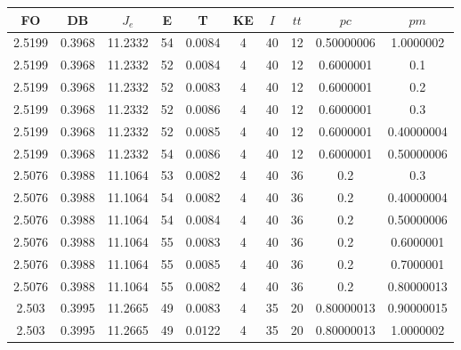 \begin{table}[h!]
    \footnotesize
    \begin{center}
        \begin{tabular}{|c|c|c|c|c|c|c|c|c|c|}
        \hline
            {\bf FO} & {\bf DB} & $J_e$ & {\bf E} & {\bf T} & {\bf KE} & $I$ & $tt$ & $pc$ & $pm$ \\
        \hline
        \hline
            2.5199 & 0.3968  & 11.2332 & 54 & 0.0084 & 4 & 40 & 12 & 0.50000006 & 1.0000002\\
        \hline
        \hline
            2.5199 & 0.3968  & 11.2332 & 52 & 0.0084 & 4 & 40 & 12 & 0.6000001 & 0.1\\
        \hline
        \hline
            2.5199 & 0.3968  & 11.2332 & 52 & 0.0083 & 4 & 40 & 12 & 0.6000001 & 0.2\\
        \hline
        \hline
            2.5199 & 0.3968  & 11.2332 & 52 & 0.0086 & 4 & 40 & 12 & 0.6000001 & 0.3\\
        \hline
        \hline
            2.5199 & 0.3968  & 11.2332 & 52 & 0.0085 & 4 & 40 & 12 & 0.6000001 & 0.40000004\\
        \hline
        \hline
            2.5199 & 0.3968  & 11.2332 & 54 & 0.0086 & 4 & 40 & 12 & 0.6000001 & 0.50000006\\
        \hline
        \hline
            2.5076 & 0.3988  & 11.1064 & 53 & 0.0082 & 4 & 40 & 36 & 0.2 & 0.3\\
        \hline
        \hline
            2.5076 & 0.3988  & 11.1064 & 54 & 0.0082 & 4 & 40 & 36 & 0.2 & 0.40000004\\
        \hline
        \hline
            2.5076 & 0.3988  & 11.1064 & 54 & 0.0084 & 4 & 40 & 36 & 0.2 & 0.50000006\\
        \hline
        \hline
            2.5076 & 0.3988  & 11.1064 & 55 & 0.0083 & 4 & 40 & 36 & 0.2 & 0.6000001\\
        \hline
        \hline
            2.5076 & 0.3988  & 11.1064 & 55 & 0.0085 & 4 & 40 & 36 & 0.2 & 0.7000001\\
        \hline
        \hline
            2.5076 & 0.3988  & 11.1064 & 55 & 0.0082 & 4 & 40 & 36 & 0.2 & 0.80000013\\
        \hline
        \hline
            2.503 & 0.3995  & 11.2665 & 49 & 0.0083 & 4 & 35 & 20 & 0.80000013 & 0.90000015\\
        \hline
        \hline
            2.503 & 0.3995  & 11.2665 & 49 & 0.0122 & 4 & 35 & 20 & 0.80000013 & 1.0000002\\

\end{tabular}
\end{center}
\end{table}
